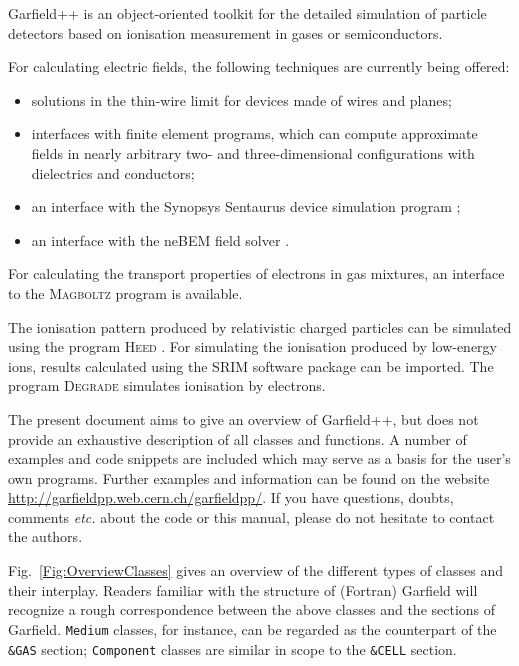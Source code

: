 Garfield++ is an object-oriented toolkit for the detailed simulation of 
particle detectors based on ionisation measurement in 
gases or semiconductors.

For calculating electric fields, the following techniques are currently
being offered:
\begin{itemize}
  \item
  solutions in the thin-wire limit for devices made of wires and planes;
  \item
  interfaces with finite element programs, 
  which can compute approximate fields in nearly arbitrary 
  two- and three-dimensional configurations 
  with dielectrics and conductors;
  \item
  an interface with the Synopsys Sentaurus device simulation program
  \cite{Synopsys};
  \item
  an interface with the neBEM field solver 
  \cite{Mukhopadhyay2007,Mukhopadhyay2006}.
\end{itemize}

For calculating the transport properties of electrons in gas 
mixtures, an interface to the \textsc{Magboltz} program 
\cite{BiagiMagboltz,Biagi1999} is available. 

The ionisation pattern produced by relativistic charged particles 
can be simulated using the program \textsc{Heed} \cite{Smirnov2005}.
For simulating the ionisation produced by low-energy ions, 
results calculated using the SRIM software package \cite{Ziegler1985} 
can be imported. The program \textsc{Degrade} simulates ionisation by 
electrons.

The present document aims to give an overview of Garfield++, 
but does not provide an exhaustive 
description of all classes and functions.
A number of examples and code snippets are included 
which may serve as a basis for the user's own programs. 
Further examples and information can be found on the website 
\url{http://garfieldpp.web.cern.ch/garfieldpp/}.
If you have questions, doubts, comments \textit{etc.} about the code 
or this manual, please do not hesitate to contact the authors.
 

Fig.~\ref{Fig:OverviewClasses} gives an overview of the different types 
of classes and their interplay. 
Readers familiar with the structure 
of (Fortran) Garfield \cite{GarfieldFortran} will recognize a 
rough correspondence between 
the above classes and the sections of Garfield. 
\texttt{Medium} classes, for instance, can be regarded as the counterpart 
of the \texttt{\&GAS} section; 
\texttt{Component} classes are similar in 
scope to the \texttt{\&CELL} section.  
 
